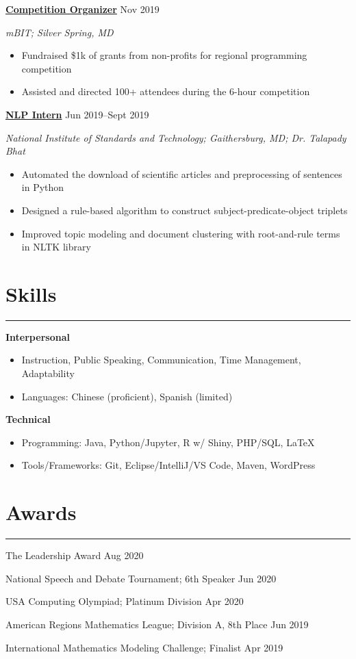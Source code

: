 \documentclass[11pt]{article}
\newcommand{\resumesection}[1]{\vspace{-0.3cm}\section*{\color{highlight}#1}\vspace{-0.3cm}\hrule\vspace{0.3cm}}
\begin{document}
\textbf{\href{https://mbit.mbhs.edu/}{Competition Organizer}} \hfill Nov 2019 \par
\textit{mBIT; Silver Spring, MD}
\begin{itemize}
	\item Fundraised \$1k of grants from non-profits for regional programming competition
	\item Assisted and directed 100+ attendees during the 6-hour competition
\end{itemize}\vspace{0.1cm}

\textbf{\href{https://github.com/petezh/Root-and-Rule-NLP}{NLP Intern}} \hfill Jun 2019--Sept 2019\par
\textit{National Institute of Standards and Technology; Gaithersburg, MD; Dr. Talapady Bhat}
\begin{itemize}
	\item Automated the download of scientific articles and preprocessing of sentences in Python
	\item Designed a rule-based algorithm to construct subject-predicate-object triplets
	\item Improved topic modeling and document clustering with root-and-rule terms in NLTK library
\end{itemize}\vspace{0.1cm}


\resumesection{Skills}

\textbf{Interpersonal}
\begin{itemize} 
	\item Instruction, Public Speaking, Communication, Time Management, Adaptability
	\item Languages: Chinese (proficient), Spanish (limited)
\end{itemize}\vspace{0.1cm}

\textbf{Technical}
\begin{itemize} 
	\item Programming: Java, Python/Jupyter, R w/ Shiny, PHP/SQL, \LaTeX
	\item Tools/Frameworks: Git, Eclipse/IntelliJ/VS Code, Maven, WordPress
\end{itemize}\vspace{0.1cm}

\resumesection{Awards}

The Leadership Award \hfill Aug 2020 \par
National Speech and Debate Tournament; 6th Speaker \hfill Jun 2020 \par
USA Computing Olympiad; Platinum Division \hfill Apr 2020 \par
American Regions Mathematics League; Division A, 8th Place \hfill Jun 2019 \par
International Mathematics Modeling Challenge; Finalist \hfill Apr 2019\par
\end{document}
